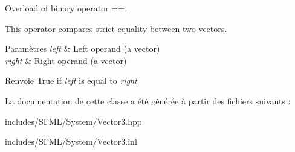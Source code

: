 Overload of binary operator ==. 

This operator compares strict equality between two vectors.


\begin{DoxyParams}{Paramètres}
{\em left} & Left operand (a vector) \\
\hline
{\em right} & Right operand (a vector)\\
\hline
\end{DoxyParams}
\begin{DoxyReturn}{Renvoie}
True if {\itshape left} is equal to {\itshape right} 
\end{DoxyReturn}


La documentation de cette classe a été générée à partir des fichiers suivants \+:\begin{DoxyCompactItemize}
\item 
includes/\+S\+F\+M\+L/\+System/Vector3.\+hpp\item 
includes/\+S\+F\+M\+L/\+System/Vector3.\+inl\end{DoxyCompactItemize}
